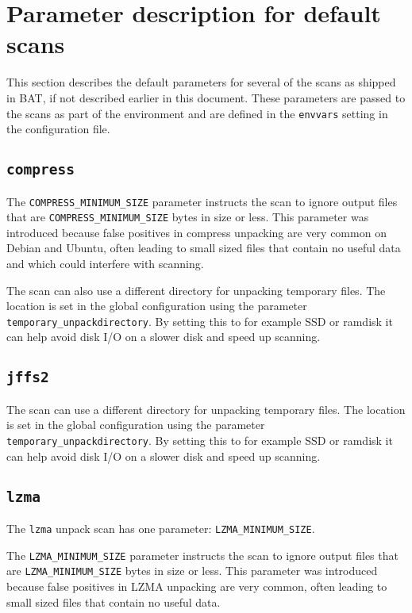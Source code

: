 \documentclass[10pt,a4paper]{article}
\begin{document}
\section{Parameter description for default scans}

This section describes the default parameters for several of the scans as
shipped in BAT, if not described earlier in this document. These parameters are
passed to the scans as part of the environment and are defined in the
\texttt{envvars} setting in the configuration file.

\subsection{\texttt{compress}}

The \texttt{COMPRESS\_MINIMUM\_SIZE} parameter instructs the scan to ignore
output files that are \texttt{COMPRESS\_MINIMUM\_SIZE} bytes in size or less.
This parameter was introduced because false positives in compress unpacking are
very common on Debian and Ubuntu, often leading to small sized files that
contain no useful data and which could interfere with scanning.

The scan can also use a different directory for unpacking temporary files.
The location is set in the global configuration using the parameter
\texttt{temporary\_unpackdirectory}. By setting this to for example SSD or
ramdisk it can help avoid disk I/O on a slower disk and speed up scanning.

\subsection{\texttt{jffs2}}

The scan can use a different directory for unpacking temporary files.
The location is set in the global configuration using the parameter
\texttt{temporary\_unpackdirectory}. By setting this to for example SSD or
ramdisk it can help avoid disk I/O on a slower disk and speed up scanning.

\subsection{\texttt{lzma}}

The \texttt{lzma} unpack scan has one parameter: \texttt{LZMA\_MINIMUM\_SIZE}.

The \texttt{LZMA\_MINIMUM\_SIZE} parameter instructs the scan to ignore output
files that are \texttt{LZMA\_MINIMUM\_SIZE} bytes in size or less. This
parameter was introduced because false positives in LZMA unpacking are very
common, often leading to small sized files that contain no useful data.
\end{document}
